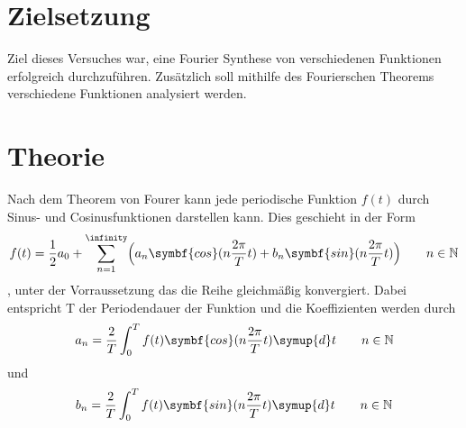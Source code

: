 \section{Zielsetzung}
\label{sec:Zielsetzung}
Ziel dieses Versuches war, eine Fourier Synthese von verschiedenen Funktionen erfolgreich durchzuführen.
Zusätzlich soll mithilfe des Fourierschen Theorems verschiedene Funktionen analysiert werden.

\section{Theorie}
\label{sec:Theorie}
Nach dem Theorem von Fourer kann jede periodische Funktion $f(t)$ durch Sinus- und Cosinusfunktionen darstellen kann.
Dies geschieht in der Form 
\begin{equation}
    f(t)=\frac{1}{2}a_0+\sum_{n=1}^{\infinity}\Bigl(a_n \symbf{cos}(n \frac{2 \pi}{T} t) + b_n \symbf{sin}(n \frac{2\pi}{T}t)\Bigr) \qquad n\in\mathbb{N}
    \label{eqn:f_reihe}
\end{equation}, unter der Vorraussetzung das die Reihe gleichmäßig konvergiert.
Dabei entspricht T der Periodendauer der Funktion und die Koeffizienten werden durch
\begin{equation}
    a_n=\frac{2}{T}\int_0^T f(t) \symbf{cos}(n \frac{2\pi}{T}t) \symup{d}t \qquad n\in\mathbb{N}
    \label{eqn:a_n}
\end{equation}
und 
\begin{equation}
    b_n=\frac{2}{T}\int_0^T f(t) \symbf{sin}(n \frac{2\pi}{T}t) \symup{d}t \qquad n\in\mathbb{N}
    \label{eqn:b_n}
\end{equation}

\cite{sample}
